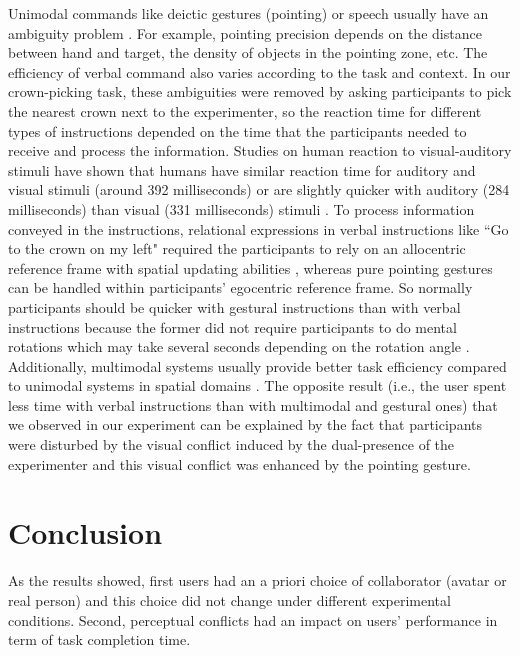 Unimodal commands like deictic gestures (pointing) or speech usually have an ambiguity problem \citep{Bangerter2004Using}. For example, pointing precision depends on the distance between hand and target, the density of objects in the pointing zone, etc. The efficiency of verbal command also varies according to the task and context. In our crown-picking task, these ambiguities were removed by asking participants to pick the nearest crown next to the experimenter, so the reaction time for different types of instructions depended on the time that the participants needed to receive and process the information. Studies on human reaction to visual-auditory stimuli have shown that humans have similar reaction time for auditory and visual stimuli (around 392 milliseconds) \citep{Suied2009Integration} or are slightly quicker with auditory (284 milliseconds) than visual (331 milliseconds) stimuli \citep{Shelton2010Comparison}. To process information conveyed in the instructions, relational expressions in verbal instructions like ``Go to the crown on my left" required the participants to rely on an allocentric reference frame with spatial updating abilities \citep{Riecke2007Spatial}, whereas pure pointing gestures can be handled within participants' egocentric reference frame. So normally participants should be quicker with gestural instructions than with verbal instructions because the former did not require participants to do mental rotations which may take several seconds depending on the rotation angle \citep{Shepard1971Mental}. Additionally, multimodal systems usually provide better task efficiency compared to unimodal systems in spatial domains \citep{Oviatt1999Ten}. The opposite result (i.e., the user spent less time with verbal instructions than with multimodal and gestural ones) that we observed in our experiment can be explained by the fact that participants were disturbed by the visual conflict induced by the dual-presence of the experimenter and this visual conflict was enhanced by the pointing gesture.



\section{Conclusion}
As the results showed, first users had an a priori choice of collaborator (avatar or real person) and this choice did not change under different experimental conditions. Second, perceptual conflicts had an impact on users' performance in term of task completion time. 

